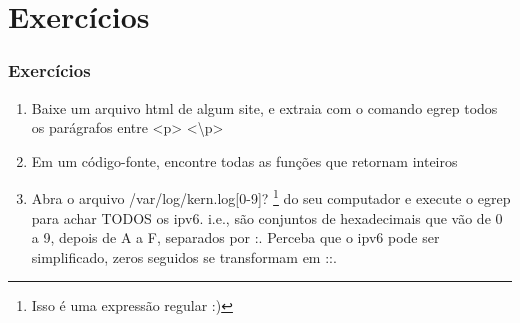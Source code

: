 \section{Exercícios}
\frame{\tableofcontents[currentsection]}

\begin{frame}
\frametitle{Exercícios}
\begin{enumerate}
	\item Baixe um arquivo html de algum site, e extraia com o comando egrep todos os parágrafos entre <p> <\textbackslash p>

	\item Em um código-fonte, encontre todas as funções que retornam inteiros

	\item Abra o arquivo /var/log/kern.log[0-9]? \footnote{Isso é uma expressão regular :)} do seu computador e execute o egrep para achar TODOS os ipv6. i.e., são conjuntos de hexadecimais que vão de 0 a 9, depois de A a F, separados por :. Perceba que o ipv6 pode ser simplificado, zeros seguidos se transformam em ::.

\end{enumerate}
\end{frame}
